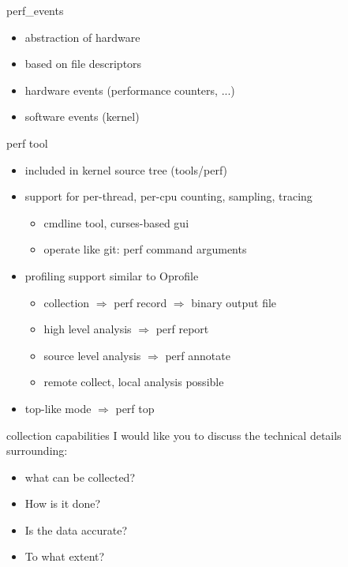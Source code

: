 \begin{frame}{perf\_events}
\begin{itemize}
  \item abstraction of hardware
  \item based on file descriptors
  \item hardware events (performance counters, ...)
  \item software events (kernel)
\end{itemize}
\end{frame}

\begin{frame}{perf tool}
\begin{itemize}
  \item included in kernel source tree (tools/perf)
  \item support for per-thread, per-cpu counting, sampling, tracing
  \begin{itemize}
    \item cmdline tool, curses-based gui
    \item operate like git: perf command arguments
  \end{itemize}
  \item profiling support similar to Oprofile
  \begin{itemize}
    \item collection $\Rightarrow$ perf record $\Rightarrow$ binary output file
    \item high level analysis $\Rightarrow$ perf report
    \item source level analysis $\Rightarrow$ perf annotate
    \item remote collect, local analysis possible
  \end{itemize}
  \item top-like mode $\Rightarrow$ perf top
\end{itemize}
\end{frame}

\begin{frame}{collection capabilities}
I would like you to discuss the technical details surrounding:
\begin{itemize}
  \item what can be collected?
  \item How is it done?
  \item Is the data accurate?
  \item To what extent?
\end{itemize}
\end{frame}



